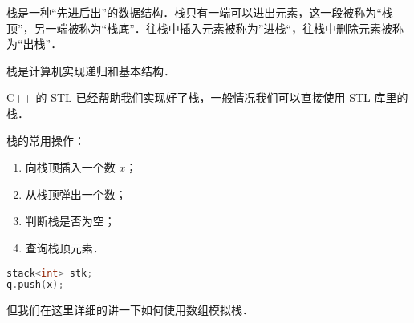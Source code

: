 
栈是一种“先进后出”的数据结构．栈只有一端可以进出元素，这一段被称为“栈顶”，另一端被称为“栈底”．往栈中插入元素被称为”进栈“，往栈中删除元素被称为“出栈”．

栈是计算机实现递归和基本结构．

C++ 的 STL 已经帮助我们实现好了栈，一般情况我们可以直接使用 STL 库里的栈．

栈的常用操作：
\begin{enumerate}
\item 向栈顶插入一个数 $x$；
\item 从栈顶弹出一个数；
\item 判断栈是否为空；
\item 查询栈顶元素．
\end{enumerate}

\begin{lstlisting}[language=cpp]
stack<int> stk;
q.push(x);
\end{lstlisting}

但我们在这里详细的讲一下如何使用数组模拟栈．
